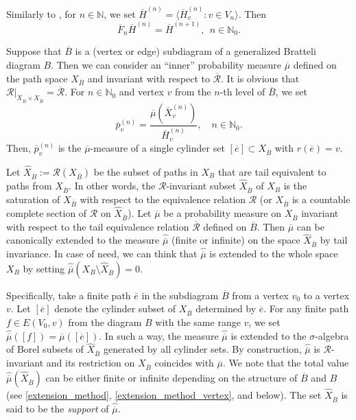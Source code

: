 \documentclass[11pt,reqno]{amsart}
\theoremstyle{definition}
\theoremstyle{remark}
\theoremstyle{plain}
\def\ol{\overline}
\def\ov{\overline}
\def\wh{\widehat}
\newcommand{\N}{\mathbb N}
\numberwithin{equation}{section}
\begin{document}
Similarly to , for $n \in \N$, we 
set $\ol H^{(n)} = \langle \ol H^{(n)}_v : v \in V_n \rangle$. Then 
\begin{equation}\label{formula for heights}
\ol F_n \ol H^{(n)} = \ol H^{(n+1)}, \ \ n \in \N_{0}.
\end{equation}

Suppose that $\ol B$ is a (vertex or edge) subdiagram of a generalized Bratteli diagram $B$. Then we can consider an ``inner'' probability measure $\ol\mu$ defined on the path space $X_{\ol B}$ and invariant with respect to $\mathcal {\ol R}$. It is obvious that $\mathcal R|_{X_{\ol B}\times X_{\ol B}} = \mathcal {\ol R}$. For $n \in \N_0$ and vertex $v$ from the $n$-th level of $\ol B$, we set 
\begin{equation}\label{eq: p_v_n_bar}
  \overline{p}_v^{(n)} = \dfrac{\overline{\mu}(\overline{X}_v^{(n)})}{\overline{H}_v^{(n)}}, \quad n  \in \N_0.  
\end{equation} Then, $\overline{p}_v^{(n)}$ is the $\ol \mu$-measure of a single cylinder set $[\ol e] \subset X_{\ol B}$  with $r(\ol e) =v$. 

Let $\widehat X_{\ol B}:= \mathcal R(X_{\ol B})$ be the subset of paths in $X_B$ that are tail equivalent to paths from $X_{\ol B}$. In other words, the $\mathcal R$-invariant subset $\widehat X_{\ol B} $ of $X_B$ is the saturation of $X_{\ol B}$ with respect to the equivalence relation $\mathcal R$ (or $X_{\ol B}$ is a countable complete section of  $\mathcal R$ on $\widehat X_{\ol B}$). Let $\ov \mu$ be a probability measure on $X_{\ol B}$ invariant with respect to the tail equivalence relation $\mathcal{\ol R}$ defined on $\ol B$. Then $\ov \mu$ can be canonically extended to the measure $\widehat{\ov \mu}$ (finite or infinite) on the space $\widehat X_{\ol B}$ by tail invariance. In case of need, we can think that $\widehat{\ov \mu}$ is extended to the whole space $X_{B}$ by setting $\widehat {\ov \mu} (X_B \setminus \widehat{X}_{\ol B}) = 0$.

Specifically, take a finite path $\ol e$ in the subdiagram $\ol B$ from a vertex $v_0$ to a vertex $v$. 
Let $[\ol e]$ denote the cylinder subset of $X_{\ol B}$ determined by $\ol e$. For any finite path $f \in E(V_0, v)$ from the diagram $B$ with the same range $v$, we set $\widehat{\ov \mu} ([f])  = \ov \mu([\ol e])$. In such a way, the measure $\widehat{\ov \mu}$ is extended to the  $\sigma$-algebra of Borel subsets of $\wh X_{\ol B}$ generated by all cylinder sets.
By construction, $\wh {\ov \mu}$  is $\mathcal R$-invariant and its restriction on $X_{\ol B}$ coincides with $\ov \mu$. We note that the total value $\wh{\ov \mu}(\wh X_{\ol B})$ can be either finite or infinite depending on the structure of $\ol B$ and $B$ (see \eqref{extension_method}, \eqref{extension_method_vertex}, and  below). The set $\wh X_{\ol B}$  is said to be the {\em support} of $\widehat{\ov \mu}$.
\end{document}
